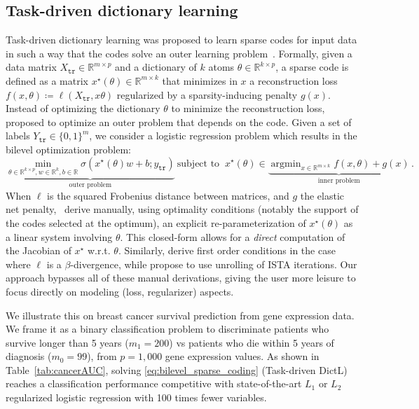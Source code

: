 \documentclass{article}
\def\RR{{\mathbb R}}
\DeclareMathOperator*{\argmin}{argmin}
\def\training{{\mathtt{tr}}}
\begin{document}
\subsection{Task-driven dictionary learning}
\label{sec:sparse-coding}

Task-driven dictionary learning was proposed to learn sparse codes for input
data in such a way that the codes solve an outer learning
problem~\cite{mairal_2012,sprechmann2014supervised,zarka2019deep}.
%
Formally, given a data matrix $X_\training \in \RR^{m \times p}$ 
and a dictionary of $k$ atoms $\theta \in \RR^{k \times p}$, a sparse code is
defined as a matrix $x^\star(\theta)\in\mathbb{R}^{m\times k}$ that minimizes in
$x$ a reconstruction loss $f(x, \theta) \coloneqq \ell(X_\training, x\theta)$
regularized by a sparsity-inducing penalty $g(x)$. Instead of optimizing the
dictionary $\theta$ to minimize the reconstruction loss, \cite{mairal_2012}
proposed to optimize an outer problem that depends on the code. 
Given a set of labels $Y_\training \in \{0, 1\}^{m}$, we consider a logistic
regression problem which results in the bilevel optimization problem:
\begin{equation}\label{eq:bilevel_sparse_coding}
\underbrace{\min_{\theta \in \mathbb{R}^{k \times p}, w\in\mathbb{R}^k, b\in\RR}
\sigma(x^\star(\theta)w + b; y_\training)}_{\text{outer problem}} ~\text{
subject to }~
x^\star(\theta) \in \underbrace{\argmin_{x \in \mathbb{R}^{m\times k}} f(x,
\theta) + g(x)}_{\text{inner problem}}\,.
\end{equation}
%
When $\ell$ is the squared Frobenius distance between matrices, and $g$ the
elastic net penalty,~\cite[Eq. 21]{mairal_2012} derive manually, using
optimality conditions (notably the support of the codes selected at the
optimum), an explicit re-parameterization of $x^\star(\theta)$ as a linear
system involving $\theta$. This closed-form allows for a \textit{direct}
computation of the Jacobian of $x^\star$ w.r.t. $\theta$. Similarly,
\cite{sprechmann2014supervised} derive first order conditions in the case where
$\ell$ is a $\beta$-divergence, while \cite{zarka2019deep} propose to use
unrolling of ISTA iterations. Our approach bypasses all of these manual
derivations, giving the user more leisure to focus directly on modeling (loss,
regularizer) aspects.

We illustrate this on breast cancer survival prediction from gene
expression data. We frame it as a binary classification problem to discriminate
patients who survive longer than 5 years ($m_1=200$) vs patients who die within
5 years of diagnosis ($m_0=99$), from $p=1,000$ gene expression values. As shown
in Table~\ref{tab:cancerAUC}, solving \eqref{eq:bilevel_sparse_coding}
(Task-driven DictL) reaches a classification performance competitive with
state-of-the-art $L_1$ or $L_2$ regularized logistic regression with 100 times
fewer variables.  
\end{document}
